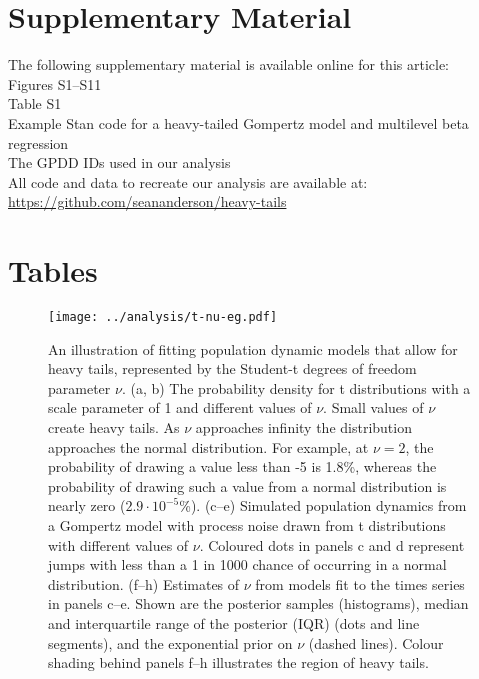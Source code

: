\section{Supplementary Material}

The following supplementary material is available online for this article:\\
Figures S1--S11\\
Table S1\\
Example Stan code for a heavy-tailed Gompertz model and multilevel beta
regression\\
The GPDD IDs used in our analysis\\
All code and data to recreate our analysis are available at:\\
\url{https://github.com/seananderson/heavy-tails}




\clearpage

\section{Tables}



\begin{figure}[htbp]
\begin{center}
\texttt{[image: ../analysis/t-nu-eg.pdf]}
\caption{
An illustration of fitting population dynamic models that allow for heavy
tails, represented by the Student-t degrees of freedom parameter $\nu$. (a, b)
The probability density for t distributions with a scale parameter of 1 and
different values of $\nu$. Small values of $\nu$ create heavy tails. As $\nu$
approaches infinity the distribution approaches the normal distribution. For
example, at $\nu = 2$, the probability of drawing a value less than -5 is
1.8\%, whereas the probability of drawing such a value from a normal
distribution is nearly zero ($2.9\cdot10^{-5}$\%). (c--e) Simulated population
dynamics from a Gompertz model with process noise drawn from t distributions
with different values of $\nu$. Coloured dots in panels c and d represent jumps
with less than a 1 in 1000 chance of occurring in a normal distribution. (f--h)
Estimates of $\nu$ from models fit to the times series in panels c--e. Shown
are the posterior samples (histograms), median and interquartile range of the
posterior (IQR) (dots and line segments), and the exponential prior on $\nu$
(dashed lines). Colour shading behind panels f--h illustrates the region of
heavy tails.}
\label{fig:didactic}
\end{center}
\end{figure}

